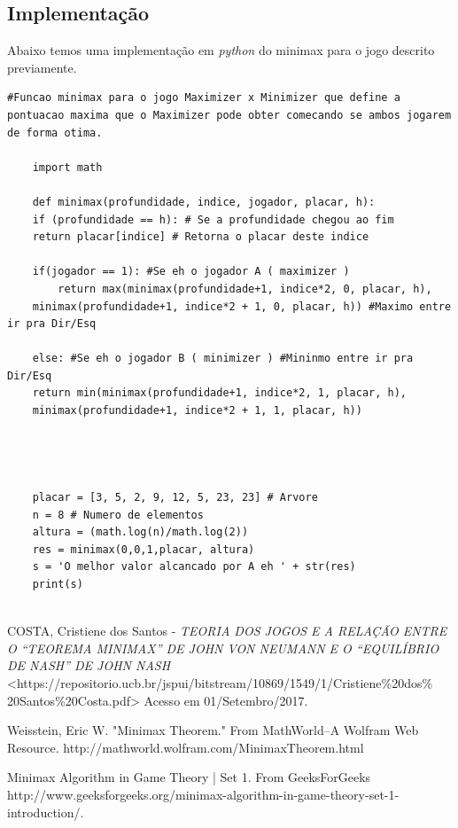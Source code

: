 \documentclass[]{article}
\begin{document}
\subsection{Implementação}
 Abaixo temos uma implementação em \emph{python} do minimax para o jogo descrito previamente.
	\begin{lstlisting}[]
	#Funcao minimax para o jogo Maximizer x Minimizer que define a pontuacao maxima que o Maximizer pode obter comecando se ambos jogarem de forma otima.
	
	import math
	
	def minimax(profundidade, indice, jogador, placar, h):
	if (profundidade == h): # Se a profundidade chegou ao fim
	return placar[indice] # Retorna o placar deste indice	
	
	if(jogador == 1): #Se eh o jogador A ( maximizer )
		return max(minimax(profundidade+1, indice*2, 0, placar, h),  
	minimax(profundidade+1, indice*2 + 1, 0, placar, h)) #Maximo entre ir pra Dir/Esq
	
	else: #Se eh o jogador B ( minimizer ) #Mininmo entre ir pra Dir/Esq
	return min(minimax(profundidade+1, indice*2, 1, placar, h), 
	minimax(profundidade+1, indice*2 + 1, 1, placar, h))
	
	
	
	
	placar = [3, 5, 2, 9, 12, 5, 23, 23] # Arvore
	n = 8 # Numero de elementos
	altura = (math.log(n)/math.log(2))
	res = minimax(0,0,1,placar, altura)
	s = 'O melhor valor alcancado por A eh ' + str(res)
	print(s)
	
	\end{lstlisting}
	
\begin{thebibliography}{1}
	 COSTA, Cristiene dos Santos - \textit{TEORIA DOS JOGOS E A RELAÇÃO ENTRE O “TEOREMA MINIMAX” DE JOHN VON NEUMANN E O “EQUILÍBRIO DE NASH” DE JOHN NASH} <https://repositorio.ucb.br/jspui/bitstream/10869/1549/1/Cristiene\%20dos\%
	20Santos\%20Costa.pdf> Acesso em 01/Setembro/2017.
	
	 Weisstein, Eric W. "Minimax Theorem." From MathWorld--A Wolfram Web Resource. http://mathworld.wolfram.com/MinimaxTheorem.html
	
	 Minimax Algorithm in Game Theory | Set 1. From GeeksForGeeks  http://www.geeksforgeeks.org/minimax-algorithm-in-game-theory-set-1-introduction/.
	
\end{thebibliography}	 
	
\end{document}
